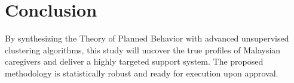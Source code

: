 \chapter{Conclusion}

By synthesizing the Theory of Planned Behavior with advanced unsupervised clustering algorithms, this study will uncover the true profiles of Malaysian caregivers and deliver a highly targeted support system. The proposed methodology is statistically robust and ready for execution upon approval.
